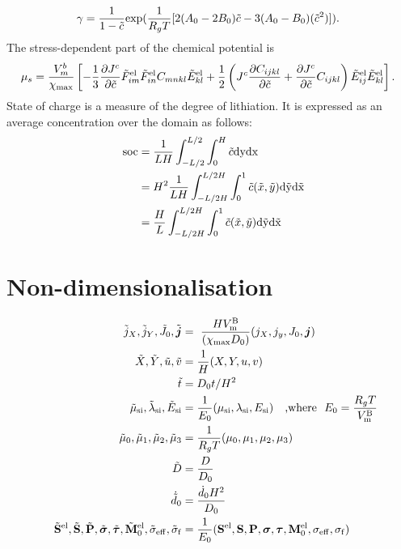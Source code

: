 \begin{align}
    \gamma &= \fc{1}{1-\td{c}}\text{exp}(\fc{1}{R_g T}[2(A_0 - 2B_0)\td{c} - 3(A_0 - B_0)(\td{c}^2)]).
\end{align}
The stress-dependent part of the chemical potential is \citep{2012JMPSCui}
\begin{align}
    \mu_s &= \fc{V_m^b}{\xmax}\left[-\fc{1}{3}\pdiff{\jc}{\tc}\tFel{im}\tFel{in}{C}_{mnkl}\tEel{kl} + \fc{1}{2}\left(\jc \pdiff{C_{ijkl}}{\tc} + \pdiff{\jc}{\tc} C_{ijkl}\right)\tEel{ij}\tEel{kl}\right].
\end{align}
State of charge is a measure of the degree of lithiation. It is expressed as an average concentration over the domain as follows:
\begin{align}
    \rm{soc} &= \fc{1}{LH}\int_{-L/2}^{L/2} \int_0^H \tc \rm{d}y \rm{d}x  \nonumber \\
         &= H^2\fc{1}{LH} \int_{-L/2H}^{L/2H} \int_0^1 \tc(\td{x}, \td{y}) \rm{d}\td{y} \rm{d}\td{x} \nonumber \\
         &= \fc{H}{L}\int_{-L/2H}^{L/2H} \int_0^1 \tc(\td{x}, \td{y}) \rm{d}\td{y} \rm{d}\td{x} 
\end{align}

\section{Non-dimensionalisation}\label{section:nonDim}
\begin{align}
    \td{j}_X, \td{j}_Y, \td{J}_0, \td{\bm{j}} &=  \fc{H \vmb}{(\xmax D_0)} (j_X, j_y, J_0, \bm{j}) \\
    \tX, \tY, \tu, \tv &= \fc{1}{H}(X, Y, u, v) \\
    \td{t} &= D_0 t/H^2 \\
     \tmusi, \tlamsi, \td{E}_{\text{si}} &= \fc{1}{E_0} (\mu_{\text{si}}, \lambda_{\text{si}}, E_{\text{si}}) 
     \text{,where }  E_0 = \fc{R_g T}{\vmb} \\
     \td{\mu}_0, \td{\mu}_1, \td{\mu}_2, \td{\mu}_3 &= \fc{1}{R_g T}(\mu_0, \mu_1, \mu_2, \mu_3) \\
     \td{D} &= \fc{D}{D_0} \\
     \dot{\td{d}}_{0} &= \fc{\dZEROdot H^2}{D_0} \\
     \td{\PKS}^{\el}, \td{\PKS}, \td{\PK}, \td{\CS}, \td{\DCS}, \td{\mathbf{M}}^{\el}_{0}, \td{\sigma}_{\rm{eff}}, \td{\sigma}_{\rm{f}} &= \fc{1}{E_0}(\PKS^{\el}, \PKS, \PK, \CS, \DCS, \mathbf{M}^{\el}_{0}, \sigmaeff, \sigmaf)
\end{align}

